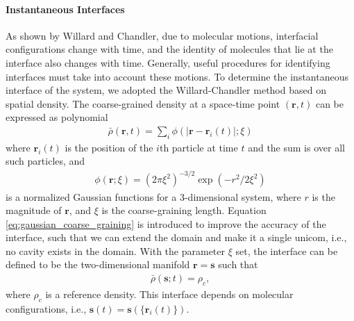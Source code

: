 \paragraph{Instantaneous Interfaces}\label{para:II}
As shown by Willard and Chandler, due to molecular motions, interfacial configurations
change with time, and the identity of molecules that lie at the interface also changes with time. 
Generally, useful procedures for identifying interfaces must take into account these motions\cite{Willard2010}. 
To determine the instantaneous interface of the system, we adopted the Willard-Chandler method based on spatial density\cite{Willard2010}.
The coarse-grained density at a space-time point $(\mathbf{r},t)$ can be expressed as polynomial
\begin{eqnarray}
\bar{\rho}(\mathbf{r}, t)=\sum_{i} \phi(|\mathbf{r}-\mathbf{r}_{i}(t)|; \xi) 
\end{eqnarray}
where ${\mathbf{r}}_i(t)$ is the position of the $i$th particle at time $t$ and the sum is over all such particles, and 
\begin{eqnarray}
\phi(\mathbf{r};\xi)=(2 \pi \xi^{2})^{-3/ 2} \exp (-r^{2} / 2 \xi^{2}) 
\label{eq:gaussian_coarse_graining}
\end{eqnarray} 
is a normalized Gaussian functions for a 3-dimensional system, where $r$ is the magnitude of ${\mathbf r}$, and $\xi$ is the coarse-graining length.
Equation \ref{eq:gaussian_coarse_graining} is introduced to improve the accuracy of the interface, such that we can extend the domain and make it a single unicom,
i.e., no cavity exists in the domain.
With the parameter $\xi$ set, the interface can be defined to be the two-dimensional manifold ${\mathbf r} = {\mathbf s}$ such that
\begin{eqnarray}
\bar\rho(\mathbf{s};t)= \rho_c, 
\label{eq:rho_c}
\end{eqnarray} 
where $\rho_c$ is a reference density. This interface depends on molecular configurations, i.e.,
${\mathbf s}(t) = {\mathbf s}(\{{\mathbf r}_i(t)\})$. 

